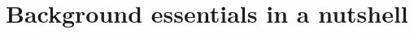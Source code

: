 \documentclass[10pt, aspectratio=169, compress, protectframetitle, handout]{beamer}
\begin{document}
  
  

  \section{ Background essentials in a nutshell}
  
\end{document}
